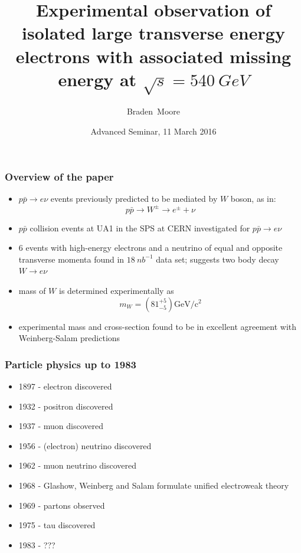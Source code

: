 \documentclass[xcolor=table]{beamer}
\title[Observation of the W (1983)] %
{Experimental observation of isolated large transverse energy electrons with associated missing energy at $\sqrt{s}=\SI{540}{GeV}$}
\subtitle{}
\author[Braden Moore] %
{Braden~Moore}
\institute[] %
{
  School of Physics\\
  The University of Melbourne\\
  \vspace{0.5cm}
}
\date[11 March 2016] %
{Advanced Seminar, 11 March 2016}
\begin{document}
 
\frame{\titlepage}


\begin{frame}
\frametitle{Overview of the paper}
\fontsize{9pt}{12}\selectfont


\begin{itemize}
\item $p\bar{p}\to e\nu$ events previously predicted to be mediated by $W$ boson, as in:
\begin{equation*}
p\bar{p}\to W^{\pm}\to e^{\pm}+\nu
\end{equation*}
\item $p\bar{p}$ collision events at UA1 in the SPS at CERN investigated for $p\bar{p}\to e\nu$
\item 6 events with high-energy electrons and a neutrino of equal and opposite transverse momenta found in $\SI{18}{nb^{-1}}$ data set; suggests two body decay $W\to e\nu$
\item mass of $W$ is determined experimentally as 
\begin{equation*}
m_W=\left(81^{+5}_{-5}\right)\text{GeV}/\text{c}^2
\end{equation*}
\item experimental mass and cross-section found to be in excellent agreement with Weinberg-Salam predictions
\end{itemize}


\end{frame}


\begin{frame}
\frametitle{Particle physics up to 1983}
\fontsize{9pt}{12}\selectfont

\begin{itemize}
\item 1897 - electron discovered
\item 1932 - positron discovered
\item 1937 - muon discovered
\item 1956 - (electron) neutrino discovered
\item 1962 - muon neutrino discovered
\item 1968 - Glashow, Weinberg and Salam formulate unified electroweak theory
\item 1969 - partons observed
\item 1975 - tau discovered
\item 1983 - ???
\end{itemize}


\end{frame}
\end{document}
